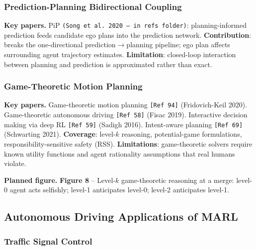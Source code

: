 \documentclass[12pt, a4paper]{article}
\begin{document}
\subsubsection{Prediction-Planning Bidirectional Coupling}

\begin{outline_note}
\textbf{Key papers.}
PiP \texttt{(Song et al.\ 2020 -- in refs folder)}: planning-informed
prediction feeds candidate ego plans into the prediction network.
\textbf{Contribution}: breaks the one-directional prediction$\to$planning
pipeline; ego plan affects surrounding agent trajectory estimates.
\textbf{Limitation}: closed-loop interaction between planning and prediction
is approximated rather than exact.
\end{outline_note}

\subsubsection{Game-Theoretic Motion Planning}

\begin{outline_note}
\textbf{Key papers.}
Game-theoretic motion planning \texttt{[Ref\,94]} (Fridovich-Keil 2020).
Game-theoretic autonomous driving \texttt{[Ref\,58]} (Fisac 2019).
Interactive decision making via deep RL \texttt{[Ref\,59]} (Sadigh 2016).
Intent-aware planning \texttt{[Ref\,69]} (Schwarting 2021).
\textbf{Coverage}: level-$k$ reasoning, potential-game formulations,
responsibility-sensitive safety (RSS).
\textbf{Limitations}: game-theoretic solvers require known utility functions
and agent rationality assumptions that real humans violate.

\textbf{Planned figure.}
\textbf{Figure 8} -- Level-$k$ game-theoretic reasoning at a merge:
level-0 agent acts selfishly; level-1 anticipates level-0; level-2
anticipates level-1.
\end{outline_note}

\subsection{Autonomous Driving Applications of MARL}
\label{sec:ad_apps}

\subsubsection{Traffic Signal Control}
\end{document}

